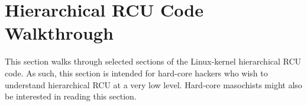 








\section{Hierarchical RCU Code Walkthrough}
\label{app:rcuimpl:rcutreewt:Hierarchical RCU Code Walkthrough}

This section walks through selected sections of the Linux-kernel
hierarchical RCU code.
As such, this section is intended for hard-core hackers who wish
to understand hierarchical RCU at a very low level.
Hard-core masochists might also be interested in reading this section.

